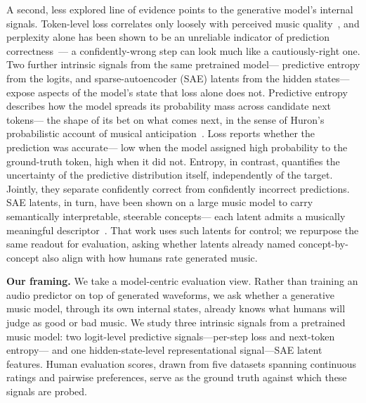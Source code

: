 \documentclass{article}
\begin{document}
A second, less explored line of evidence points
to the generative model's internal signals.
Token-level loss correlates only loosely
with perceived music quality~\cite{li2026noiseloss},
and perplexity alone has been shown to be
an unreliable indicator of prediction correctness~\cite{velickovic2026perplexity}---%
a confidently-wrong step can look much like a cautiously-right one.
Two further intrinsic signals from the same pretrained model---%
predictive entropy from the logits,
and sparse-autoencoder (SAE) latents from the hidden states---%
expose aspects of the model's state that loss alone does not.
Predictive entropy describes how the model spreads its probability mass
across candidate next tokens---%
the shape of its bet on what comes next,
in the sense of Huron's probabilistic account
of musical anticipation~\cite{huron2006sweet}.
Loss reports whether the prediction was accurate---%
low when the model assigned high probability to the ground-truth token,
high when it did not.
Entropy, in contrast, quantifies the uncertainty
of the predictive distribution itself, independently of the target.
Jointly, they separate confidently correct from confidently incorrect predictions.
SAE latents, in turn, have been shown on a large music model
to carry semantically interpretable, steerable concepts---%
each latent admits a musically meaningful descriptor~\cite{singh2025steering}.
That work uses such latents for control;
we repurpose the same readout for evaluation,
asking whether latents already named concept-by-concept
also align with how humans rate generated music.

\textbf{Our framing.}
We take a model-centric evaluation view.
Rather than training an audio predictor on top of generated waveforms,
we ask whether a generative music model, through its own internal states,
already knows what humans will judge as good or bad music.
We study three intrinsic signals from a pretrained music model:
two logit-level predictive signals---per-step loss and next-token entropy---%
and one hidden-state-level representational signal---SAE latent features.
Human evaluation scores, drawn from five datasets spanning
continuous ratings and pairwise preferences,
serve as the ground truth against which these signals are probed.
\end{document}
